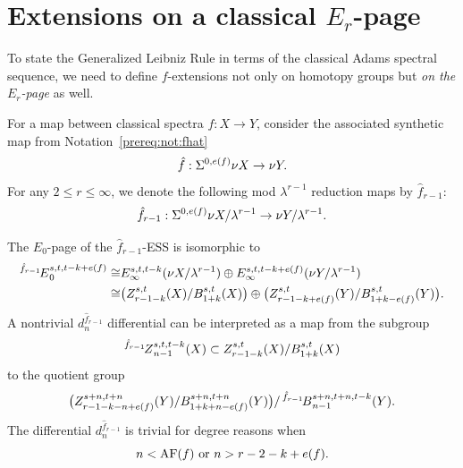 \section{Extensions on a classical $E_r$-page} \label{sec:extenpage}

To state the Generalized Leibniz Rule in terms of the classical Adams spectral sequence, we need to define $f$-extensions not only on homotopy groups but \emph{on the $E_r$-page} as well.

\begin{notation}
For a map between classical spectra $f: X\to Y$, consider the associated synthetic map from Notation~\ref{prereq:not:fhat}
$$\hat f: \Sigma^{0,e(f)}\nu X\to \nu Y.$$
For any $2\le r\le \infty$, we denote the following mod $\lambda^{r-1}$ reduction maps by $\hat f_{r-1}$:
$$\hat f_{r-1}: \Sigma^{0,e(f)}\nu X/\lambda^{r-1}\to \nu Y/\lambda^{r-1}.$$
\end{notation}

The $E_0$-page of the $\hat f_{r-1}$-ESS is isomorphic to
$$\begin{aligned}
    \prescript{\hat f_{r-1}\!}{}{E}_0^{s,t,t-k+e(f)}\cong & E_\infty^{s,t,t-k}(\nu X/\lambda^{r-1})\oplus E_\infty^{s,t,t-k+e(f)}(\nu Y/\lambda^{r-1})\\
    \cong & \big(Z_{r-1-k}^{s,t}(X)/B_{1+k}^{s,t}(X)\big)\oplus \big(Z_{r-1-k+e(f)}^{s,t}(Y)/B_{1+k-e(f)}^{s,t}(Y)\big).
\end{aligned}$$
A nontrivial $d^{\hat f_{r-1}}_n$ differential can be interpreted as a map from the subgroup
\begin{equation}\label{eq:fhat-ess-source}
  \prescript{\hat f_{r-1}\!}{}{Z}_{n-1}^{s,t,t-k}(X) \subset  Z_{r-1-k}^{s,t}(X)/B_{1+k}^{s,t}(X)
\end{equation}
to the quotient group 
\begin{equation}\label{eq:fhat-ess-target}
    \big(Z_{r-1-k-n+e(f)}^{s+n,t+n}(Y)/B_{1+k+n-e(f)}^{s+n,t+n}(Y) \big)/\prescript{\hat f_{r-1}\!}{}{B}_{n-1}^{s+n,t+n,t-k}(Y).
\end{equation}
The differential $d^{\hat f_{r-1}}_n$ is trivial for degree reasons when 
$$n<\mathrm{AF}(f)\text{ or }n>r-2-k+e(f).$$


